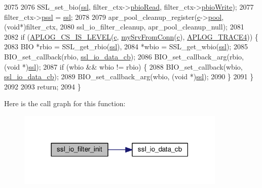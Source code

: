 \begin{DoxyCode}
2075 
2076     SSL\_set\_bio(\hyperlink{group__MOD__SSL_ga91d808d6c1c01029f9c9260b9b69a437}{ssl}, filter\_ctx->\hyperlink{structssl__filter__ctx__t_ac00e604c25ec7617cfa06f8cdc1ae215}{pbioRead}, filter\_ctx->\hyperlink{structssl__filter__ctx__t_a4e449f415486ddfd7479a71b72eaca2e}{pbioWrite});
2077     filter\_ctx->\hyperlink{structssl__filter__ctx__t_a790a9309cae82f7be6727d3bbae4bcbf}{pssl}            = \hyperlink{group__MOD__SSL_ga91d808d6c1c01029f9c9260b9b69a437}{ssl};
2078 
2079     apr\_pool\_cleanup\_register(\hyperlink{group__APACHE__CORE__HTTPD_ga7cce37ef8558e46f408cb4d0f555605b}{c}->\hyperlink{structconn__rec_a1dc5f31c7afc4a6f9c4ede0daea8cd1d}{pool}, (\textcolor{keywordtype}{void}*)filter\_ctx,
2080                               ssl\_io\_filter\_cleanup, apr\_pool\_cleanup\_null);
2081 
2082     \textcolor{keywordflow}{if} (\hyperlink{group__APACHE__CORE__LOG_gafb7ad6aa7a049a0605503883dec697f2}{APLOG\_CS\_IS\_LEVEL}(\hyperlink{group__APACHE__CORE__HTTPD_ga7cce37ef8558e46f408cb4d0f555605b}{c}, \hyperlink{group__MOD__SSL__PRIVATE_ga20a45d64a09acadc21debea6057f62a8}{mySrvFromConn}(\hyperlink{group__APACHE__CORE__HTTPD_ga7cce37ef8558e46f408cb4d0f555605b}{c}), 
      \hyperlink{group__APACHE__CORE__LOG_ga479289550d998526187ff78880378f9c}{APLOG\_TRACE4})) \{
2083         BIO *rbio = SSL\_get\_rbio(\hyperlink{group__MOD__SSL_ga91d808d6c1c01029f9c9260b9b69a437}{ssl}),
2084             *wbio = SSL\_get\_wbio(\hyperlink{group__MOD__SSL_ga91d808d6c1c01029f9c9260b9b69a437}{ssl});
2085         BIO\_set\_callback(rbio, \hyperlink{group__MOD__SSL__PRIVATE_ga262f14fe40c8b29cd4444c40be780166}{ssl\_io\_data\_cb});
2086         BIO\_set\_callback\_arg(rbio, (\textcolor{keywordtype}{void} *)\hyperlink{group__MOD__SSL_ga91d808d6c1c01029f9c9260b9b69a437}{ssl});
2087         \textcolor{keywordflow}{if} (wbio && wbio != rbio) \{
2088             BIO\_set\_callback(wbio, \hyperlink{group__MOD__SSL__PRIVATE_ga262f14fe40c8b29cd4444c40be780166}{ssl\_io\_data\_cb});
2089             BIO\_set\_callback\_arg(wbio, (\textcolor{keywordtype}{void} *)\hyperlink{group__MOD__SSL_ga91d808d6c1c01029f9c9260b9b69a437}{ssl});
2090         \}
2091     \}
2092 
2093     \textcolor{keywordflow}{return};
2094 \}
\end{DoxyCode}


Here is the call graph for this function\+:
\nopagebreak
\begin{figure}[H]
\begin{center}
\leavevmode
\includegraphics[width=282pt]{group__MOD__SSL__PRIVATE_gaaeb4e56b7b49e4a3865bfa20b13fc374_cgraph}
\end{center}
\end{figure}





